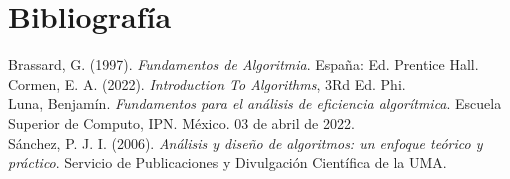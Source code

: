 \documentclass[12pt,twoside]{article}
\begin{document}
    \section{Bibliograf\'ia}
    Brassard, G. (1997). \textit {Fundamentos de Algoritmia}. España: Ed. Prentice Hall.\\[0.4cm]
    Cormen, E. A. (2022). \textit{Introduction To Algorithms}, 3Rd Ed. Phi.\\[0.4cm]
    Luna, Benjam\'in. \textit{Fundamentos para el an\'alisis de eficiencia algor\'itmica}. Escuela Superior de Computo, IPN. M\'exico. 03 de abril de 2022.\\[0.4cm]
    S\'anchez, P. J. I. (2006). \textit{Análisis y diseño de algoritmos: un enfoque teórico y práctico}. Servicio de Publicaciones y Divulgación Científica de la UMA.
\end{document}
